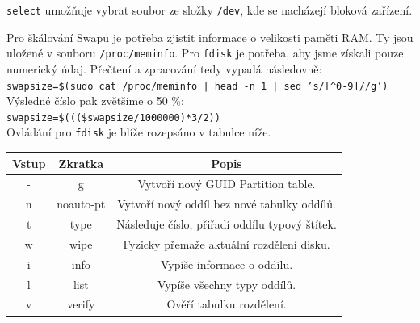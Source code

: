 \documentclass[12pt,a4paper,twoside,]{article}
\begin{document}
\hspace{-1.5em}\texttt{select} umožňuje vybrat soubor ze složky \texttt{/dev}, kde se nacházejí bloková zařízení.
\newpage
{Pro škálování Swapu je potřeba zjistit informace o velikosti paměti RAM. Ty jsou uložené v souboru \texttt{/proc/meminfo}. Pro \texttt{fdisk} je potřeba, aby jsme získali pouze numerický údaj. Přečtení a zpracování tedy vypadá následovně:\\
	
\texttt{swapsize=\$(sudo cat /proc/meminfo | head -n 1 | sed 's/[\^{}0-9]//g')}\\

\hspace*{-1.5em}Výsledné číslo pak zvětšíme o 50 \%:\\ 

\texttt{swapsize=\$(((\$swapsize/1000000)*3/2))}\\

\hspace{-1.5em}Ovládání pro \texttt{fdisk} je blíže rozepsáno v tabulce níže.
\begin{table}[h]
	\begin{tabular}{|c|c|c|}\hline
		Vstup & Zkratka & Popis \\ \hline
		-&g&Vytvoří nový GUID Partition table. \\ \hline
		n&noauto-pt&Vytvoří nový oddíl bez nové tabulky oddílů. \\ \hline
		t&type&Následuje číslo, přiřadí oddílu typový štítek. \\ \hline
		w&wipe&Fyzicky přemaže aktuální rozdělení disku.
		\\ \hline
		i&info&Vypíše informace o oddílu. \\ \hline
		l&list&Vypíše všechny typy oddílů. \\ \hline
		v&verify&Ověří tabulku rozdělení. \\ \hline
		
	\end{tabular}
\end{table}




\newpage
}
\end{document}
